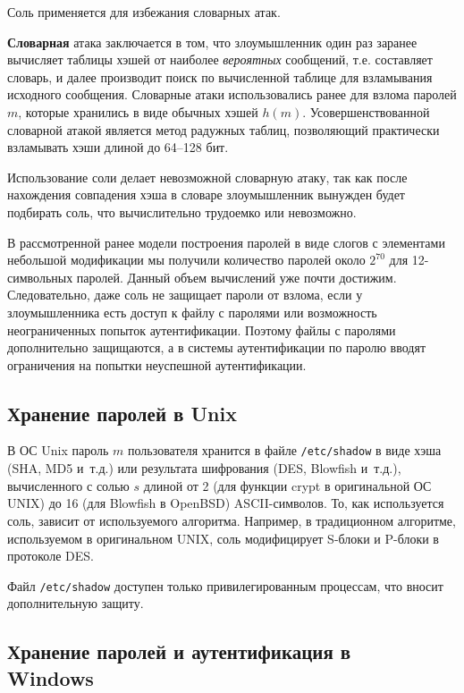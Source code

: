 \documentclass[10pt,a4paper]{book}
\begin{document}
Соль применяется для избежания словарных атак.

\textbf{Словарная} атака заключается в том, что злоумышленник один раз заранее вычисляет таблицы хэшей от наиболее \emph{вероятных} сообщений, т.е. составляет словарь, и далее производит поиск по вычисленной таблице для взламывания исходного сообщения. Словарные атаки использовались ранее для взлома паролей $m$, которые хранились в виде обычных хэшей $h(m)$. Усовершенствованной словарной атакой является метод радужных таблиц, позволяющий практически взламывать хэши длиной до 64--128 бит.

Использование соли делает невозможной словарную атаку, так как после нахождения совпадения хэша в словаре злоумышленник вынужден будет подбирать соль, что вычислительно трудоемко или невозможно.

В рассмотренной ранее модели построения паролей в виде слогов с элементами небольшой модификации мы получили количество паролей около $2^{70}$ для 12-символьных паролей. Данный объем вычислений уже почти достижим. Следовательно, даже соль не защищает пароли от взлома, если у злоумышленника есть доступ к файлу с паролями или возможность неограниченных попыток аутентификации. Поэтому файлы с паролями дополнительно защищаются, а в системы аутентификации по паролю вводят ограничения на попытки неуспешной аутентификации.


\subsection[Unix]{Хранение паролей в Unix}

В ОС Unix пароль $m$ пользователя хранится в файле \texttt{/etc/shadow} в виде хэша (SHA, MD5 и~т.д.) или результата шифрования (DES, Blowfish и~т.д.), вычисленного с солью $s$ длиной от 2 (для функции crypt в оригинальной ОС UNIX) до 16 (для Blowfish в OpenBSD) ASCII-символов. То, как используется соль, зависит от используемого алгоритма. Например, в традиционном алгоритме, используемом в оригинальном UNIX, соль модифицирует S-блоки и P-блоки в протоколе DES.

Файл \texttt{/etc/shadow} доступен только привилегированным процессам, что вносит дополнительную защиту.


\subsection[Windows]{Хранение паролей и аутентификация в \protect\\ Windows}
\end{document}
